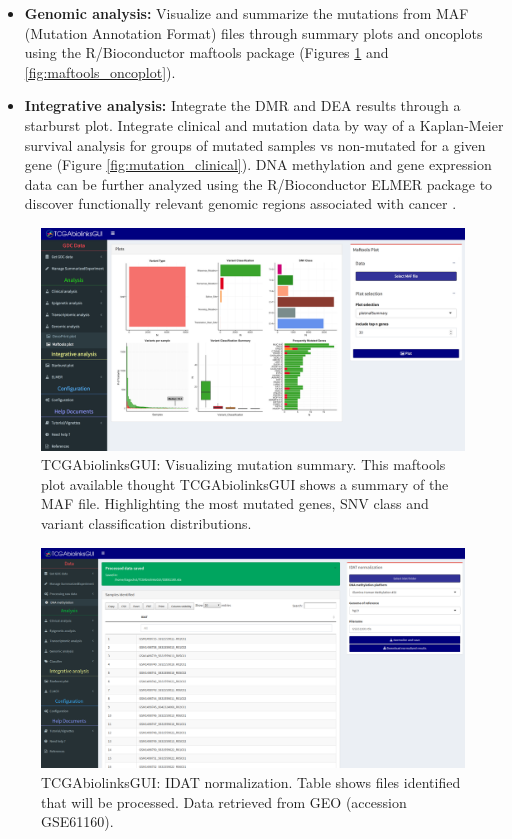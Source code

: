 \begin{itemize}
 	\item \textbf{Genomic analysis:} Visualize and summarize the mutations from MAF (Mutation Annotation Format) files through summary plots and oncoplots using the R/Bioconductor maftools package \cite{Gu20052016,Maftools} (Figures \ref{fig:maftools_summary} and \ref{fig:maftools_oncoplot}). %
	\item \textbf{Integrative analysis:} Integrate the DMR and DEA results through a starburst plot. Integrate clinical and mutation data by way of a Kaplan-Meier survival analysis for groups of mutated samples vs non-mutated for a given gene (Figure \ref{fig:mutation_clinical}). DNA methylation and gene expression data can be further analyzed using the R/Bioconductor ELMER package to discover functionally relevant genomic regions associated with cancer \cite{yao2015inferring, ELMER2}.
\end{itemize}


\begin{figure}
\includegraphics[width=1.0\linewidth]{images/maftools_summary.png}
\caption[TCGAbiolinksGUI: Visualizing mutation summary]{TCGAbiolinksGUI: Visualizing mutation summary. This maftools plot available thought TCGAbiolinksGUI shows a summary of the MAF file. Highlighting the most mutated genes, SNV class and variant classification distributions. }
\label{fig:maftools_summary}
\end{figure}


  \begin{figure}[h!]
  \centering
  \includegraphics[width=1.0\textwidth]{images/idat.pdf}
  \caption[TCGAbiolinksGUI: IDAT normalization]{TCGAbiolinksGUI: IDAT normalization. Table shows files identified that will be processed. Data retrieved from GEO (accession GSE61160). }
  \label{fig:idat}
   \end{figure}

